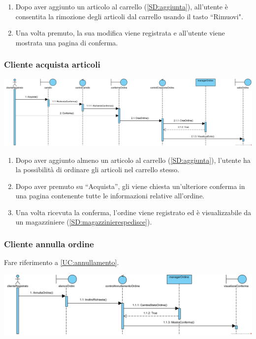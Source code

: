 \documentclass[12pt,a4paper]{article}
\begin{document}
\begin{enumerate}
\item Dopo aver aggiunto un articolo al carrello (\ref{SD:aggiunta}), all'utente è consentita la rimozione degli articoli dal carrello usando il tasto ``Rimuovi".
\item Una volta premuto, la sua modifica viene registrata e all'utente viene mostrata una pagina di conferma.
\end{enumerate}

\newpage

\subsubsection{Cliente acquista articoli}
\label{SD:acquista}

\begin{center}
\includegraphics[width=\textwidth]{SequenceDiagram/ClienteArticoloAcquista}
\end{center}

\begin{enumerate}
\item Dopo aver aggiunto almeno un articolo al carrello (\ref{SD:aggiunta}), l'utente ha la possibilità di ordinare gli articoli nel carrello stesso.
\item Dopo aver premuto su ``Acquista'', gli viene chiesta un'ulteriore conferma in una pagina contenente tutte le informazioni relative all'ordine.
\item Una volta ricevuta la conferma, l'ordine viene registrato ed è visualizzabile da un magazziniere  (\ref{SD:magazzinierespedisce}).
\end{enumerate}

\subsubsection{Cliente annulla ordine}
\label{SD:annull}

Fare riferimento a \ref{UC:annullamento}. \\

\begin{center}
\includegraphics[width=\textwidth]{SequenceDiagram/ClienteOrdineAnnulla}
\end{center}
\end{document}
